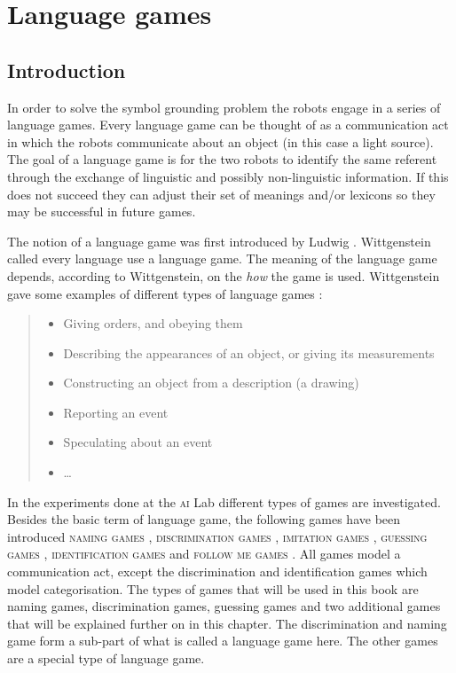 \chapter{Language games}\label{ch:lg}\label{ch:cm}
\section{Introduction}

In order to solve the symbol grounding problem the robots engage in a series of language games. Every language game can be thought of as a communication act in which the robots communicate about an object (in this case a light source). The goal of a language game is for the two robots to identify the same referent through the exchange of linguistic and possibly non-linguistic information. If this does not succeed they can adjust their set of meanings and/or lexicons so they may be successful in future games.


The notion of a language game was first introduced by Ludwig \citet{wittgenstein:1958}. Wittgenstein called every language use a language game. The meaning of the language game depends, according to Wittgenstein, on the {\em how} the game is used. Wittgenstein gave some examples of different types of language games \cite[11, §22]{wittgenstein:1958}:

\begin{quote}
\begin{itemize}
\item Giving orders, and obeying them
\item Describing the appearances of an object, or giving its measurements
\item Constructing an object from a description (a drawing)
\item Reporting an event
\item Speculating about an event
\item \ldots 
\end{itemize}
\end{quote}

In the experiments done at the \textsc{ai} Lab different types of games are investigated. Besides the basic term of language game, the following games have been introduced {\scshape naming games} \citep{steels:1996a}, {\scshape discrimination games} \citep{steels:1996b}, {\scshape imitation games} \citep{deboer:1997}, {\scshape guessing games} \citep{steelskaplan:1999}, {\scshape identification games} and {\scshape follow me games} \citep{vogt:1999a,vogt:2000}. All games model a communication act, except the discrimination and identification games which model categorisation. The types of games that will be used in this book are naming games, discrimination games, guessing games and two additional games that will be explained further on in this chapter. The discrimination and naming game form a sub-part of what is called a language game here. The other games are a special type of language game.

